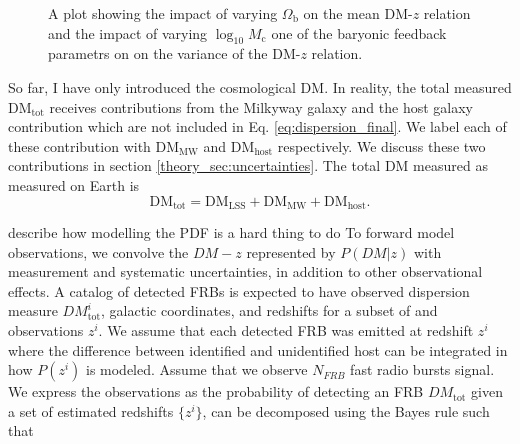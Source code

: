 \begin{figure}[h!]
    \centering
    \caption{A plot showing the impact of varying $\Omega_\mathrm{b}$ on the mean DM-$z$ relation and the impact of varying $\log_{10} M_\mathrm{c}$ one of the baryonic feedback parametrs on on the variance of the DM-$z$ relation.}
    \label{theory_fig:DM-z}
\end{figure}

So far, I have only introduced the cosmological DM. In reality, the total measured $\mathrm{DM}_\mathrm{tot}$ receives contributions from the Milkyway galaxy and the host galaxy contribution which are not included in Eq. \ref{eq:dispersion_final}. We label each of these contribution with $\mathrm{DM}_\mathrm{MW}$ and $\mathrm{DM}_\mathrm{host}$ respectively. We discuss these two contributions in section \ref{theory_sec:uncertainties}. The total DM measured as measured on Earth is 
\begin{equation}
    \mathrm{DM}_\mathrm{tot} = \mathrm{DM}_\mathrm{LSS} + \mathrm{DM}_\mathrm{MW} + \mathrm{DM}_\mathrm{host}.
\end{equation}



{\color{red} describe how modelling the PDF is a hard thing to do}
To forward model observations, we convolve the $DM-z$ represented by $P(DM|z)$ with measurement and systematic uncertainties, in addition to other observational effects. A catalog of detected FRBs is expected to have observed dispersion measure $DM_\text{tot}^i$, galactic coordinates, and redshifts for a subset of and observations $z^i$. We assume that each detected FRB was emitted at redshift $z^i$ where the difference between identified and unidentified host can be integrated in how $P(z^i)$ is modeled. Assume that we observe $N_{FRB}$ fast radio bursts signal. We express the observations as the probability of detecting an FRB $DM_\text{tot}$ given a set of estimated redshifts $\{z^i\}$, can be decomposed using the Bayes rule such that

